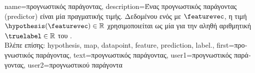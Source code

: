 {name={\foreignlanguage{greek}{προγνωστικός παράγοντας}},
	description={\foreignlanguage{greek}{Ένας προγνωστικός παράγοντας} (predictor) 
		\foreignlanguage{greek}{είναι μία}   \foreignlanguage{greek}{πραγματικής τιμής. Δεδομένου ενός} 
		 \foreignlanguage{greek}{με}  $\featurevec$, \foreignlanguage{greek}{η τιμή 
		$\hypothesis(\featurevec) \in \mathbb{R}$ χρησιμοποιείται ως μία}  \foreignlanguage{greek}{για την αληθή αριθμητική} 
		 $\truelabel \in \mathbb{R}$ \foreignlanguage{greek}{του} .
		\\
		\foreignlanguage{greek}{Βλέπε επίσης:} \gls{hypothesis}, \gls{map}, \gls{datapoint}, \gls{feature}, \gls{prediction}, \gls{label}.},
	first={\foreignlanguage{greek}{προγνωστικός παράγοντας}},
	text={\foreignlanguage{greek}{προγνωστικός παράγοντας}},
	user1={\foreignlanguage{greek}{προγνωστικός παράγοντας}}, %
  	user2={\foreignlanguage{greek}{προγνωστικού παράγοντα}} %
}

